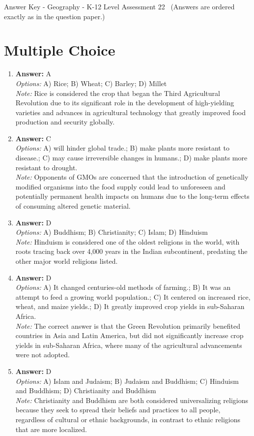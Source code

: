 \documentclass[12pt]{article}
\begin{document}
\begin{center}
Answer Key - Geography - K-12 Level Assessment 22 \
\small (Answers are ordered exactly as in the question paper.)
\end{center}

\section*{Multiple Choice}
\begin{enumerate}[label=\arabic*.]
\item \textbf{Answer:} A
\\ \textit{Options:} A) Rice; B) Wheat; C) Barley; D) Millet
\\ \textit{Note:} Rice is considered the crop that began the Third Agricultural Revolution due to its significant role in the development of high-yielding varieties and advances in agricultural technology that greatly improved food production and security globally.
\item \textbf{Answer:} C
\\ \textit{Options:} A) will hinder global trade.; B) make plants more resistant to disease.; C) may cause irreversible changes in humans.; D) make plants more resistant to drought.
\\ \textit{Note:} Opponents of GMOs are concerned that the introduction of genetically modified organisms into the food supply could lead to unforeseen and potentially permanent health impacts on humans due to the long-term effects of consuming altered genetic material.
\item \textbf{Answer:} D
\\ \textit{Options:} A) Buddhism; B) Christianity; C) Islam; D) Hinduism
\\ \textit{Note:} Hinduism is considered one of the oldest religions in the world, with roots tracing back over 4,000 years in the Indian subcontinent, predating the other major world religions listed.
\item \textbf{Answer:} D
\\ \textit{Options:} A) It changed centuries-old methods of farming.; B) It was an attempt to feed a growing world population.; C) It centered on increased rice, wheat, and maize yields.; D) It greatly improved crop yields in sub-Saharan Africa.
\\ \textit{Note:} The correct answer is that the Green Revolution primarily benefited countries in Asia and Latin America, but did not significantly increase crop yields in sub-Saharan Africa, where many of the agricultural advancements were not adopted.
\item \textbf{Answer:} D
\\ \textit{Options:} A) Islam and Judaism; B) Judaism and Buddhism; C) Hinduism and Buddhism; D) Christianity and Buddhism
\\ \textit{Note:} Christianity and Buddhism are both considered universalizing religions because they seek to spread their beliefs and practices to all people, regardless of cultural or ethnic backgrounds, in contrast to ethnic religions that are more localized.
\end{enumerate}
\end{document}
